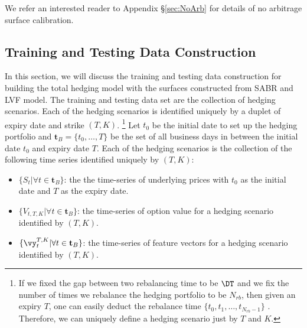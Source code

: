 We refer an interested reader to Appendix \S \ref{sec:NoArb} for details of no arbitrage surface calibration.

\subsection{Training and Testing Data Construction}
\label{sec:Augtrain}

In this section, we will discuss the training and testing data construction for building the total hedging model with the surfaces constructed from SABR and LVF model. The training and testing data set are the collection of hedging scenarios. Each of the hedging scenarios is identified uniquely by a duplet of expiry date and strike  $(T,K)$. \footnote{ If we fixed the gap between two rebalancing time to be $\DT$ and we fix the number of times we rebalance the hedging portfolio to be $N_{rb}$, then given an expiry $T$, one can easily deduct the rebalance time $\{t_0,t_1, \dots, t_{N_{rb}-1}\}$ . Therefore, we can uniquely define a hedging scenario just by $T$ and $K$.} Let $t_0$ be the initial date to set up the hedging portfolio and $\mathbf{t}_B=\{t_0,\dots,T\}$ be the set of all business days in between the initial date $t_0$ and expiry date $T$.  Each of the hedging scenarios is the collection of the following time series identified uniquely by $(T,K)$:
\begin{itemize}
	\item $\{S_t|\forall t \in \mathbf{t}_B \}$: the the time-series of underlying prices  with $t_0$ as the initial date and $T$ as the expiry date.
	\item $\{V_{t,T,K}|\forall t \in \mathbf{t}_B\}$:  the time-series of option value for a hedging scenario identified by $(T,K)$.
	\item $\{\vy^{T,K}_{t}|\forall t \in \mathbf{t}_B\}$: the time-series of feature vectors for a hedging scenario identified by $(T,K)$.
\end{itemize}


